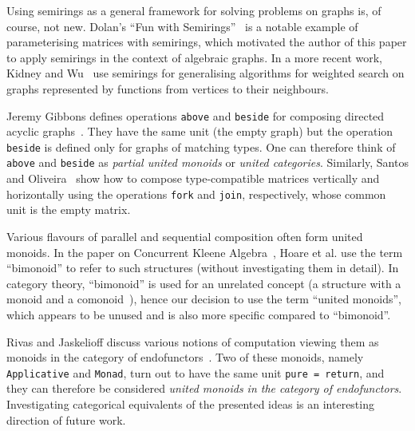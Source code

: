 \documentclass[english,submission]{programming}
\newcommand{\hcode}[1]{{\color{darkblue} \lstinline[keywordstyle={}]|#1|}} %
\begin{document}

Using semirings as a general framework for solving problems on graphs is, of
course, not new. Dolan's ``Fun with Semirings''~\cite{2013_semirings_dolan} is a
notable example of parameterising matrices with semirings, which motivated the
author of this paper to apply semirings in the context of algebraic graphs. In
a more recent work, Kidney and Wu~\cite{weighted_search} use semirings for
generalising algorithms for weighted search on graphs represented by functions
from vertices to their neighbours.



Jeremy Gibbons defines operations \hcode{above} and \hcode{beside} for composing
directed acyclic graphs~\cite{1995_gibbons_algebra}. They have the same unit
(the empty graph) but the operation \hcode{beside} is defined only for graphs of
matching types. One can therefore think of \hcode{above} and \hcode{beside} as
\emph{partial united monoids} or \emph{united categories}. Similarly, Santos and
Oliveira~\cite{typed_matrices} show how to compose type-compatible matrices
vertically and horizontally using the operations \hcode{fork} and \hcode{join},
respectively, whose common unit is the empty matrix.

Various flavours of parallel and sequential composition often form united
monoids. In the paper on Concurrent Kleene Algebra~\cite{hoare2011concurrent},
Hoare et al. use the term ``bimonoid'' to refer to such structures (without
investigating them in detail). In category theory, ``bimonoid'' is used for an
unrelated concept (a structure with a monoid and a
comonoid~\cite{porst_bimonoids}), hence our decision to use the term
``united monoids'', which appears to be unused and is also more specific
compared to ``bimonoid''.

Rivas and Jaskelioff discuss various notions of computation viewing them as
monoids in the category of endofunctors~\cite{rivas_jaskelioff_2017}. Two of
these monoids, namely \hcode{Applicative} and \hcode{Monad}, turn out to have
the same unit \hcode{pure = return}, and they can therefore be considered
\emph{united monoids in the category of endofunctors}. Investigating categorical
equivalents of the presented ideas is an interesting direction of future work.


\printbibliography
\end{document}
